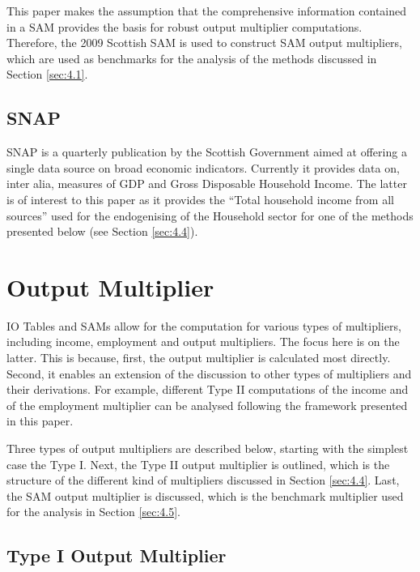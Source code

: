 \begin{doublespacing}
\bigskip

This paper makes the assumption that the comprehensive information contained in a SAM provides the basis for robust output multiplier computations. Therefore, the 2009 Scottish SAM is used to construct SAM output multipliers, which are used as benchmarks for the analysis of the methods discussed in Section \ref{sec:4.1}.

\subsection{SNAP}
\label{sec:4.2.3}

SNAP is a quarterly publication by the Scottish Government aimed at offering a single data source on broad economic indicators. Currently it provides data on, inter alia, measures of GDP and Gross Disposable Household Income. The latter is of interest to this paper as it provides the ``Total household income from all sources'' used for the endogenising of the Household sector for one of the methods presented below (see Section \ref{sec:4.4}).


\newpage
    \section{Output Multiplier}
\label{sec:4.3}

IO Tables and SAMs allow for the computation for various types of multipliers, including income, employment and output multipliers. The focus here is on the latter. This is because, first, the output multiplier is calculated most directly. Second, it enables an extension of the discussion to other types of multipliers and their derivations. For example, different Type II computations of the income and of the employment multiplier can be analysed following the framework presented in this paper.

\bigskip

Three types of output multipliers are described below, starting with the simplest case the Type I. Next, the Type II output multiplier is outlined, which is the structure of the different kind of multipliers discussed in Section \ref{sec:4.4}. Last, the SAM output multiplier is discussed, which is the benchmark multiplier used for the analysis in Section \ref{sec:4.5}.

\subsection{Type I Output Multiplier}
\label{sec:4.3.1}


\end{doublespacing}
